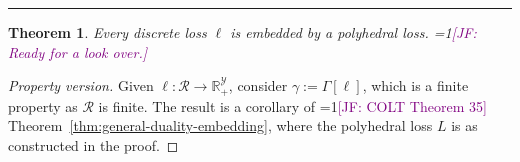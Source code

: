 \documentclass[12pt]{article}
\newcommand{\Comments}{1}
\newcommand{\mynote}[2]{\ifnum\Comments=1\textcolor{#1}{#2}\fi}
\newcommand{\raf}[1]{\mynote{green}{[RF: #1]}}
\newcommand{\jessie}[1]{\mynote{purple}{[JF: #1]}}
\newcommand{\reals}{\mathbb{R}}
\newcommand{\prop}[1]{\Gamma[#1]}
\newcommand{\simplex}{\Delta_\Y}
\newcommand{\R}{\mathcal{R}}
\newcommand{\Y}{\mathcal{Y}}
\newcommand{\risk}[1]{\underline{#1}}
\newtheorem{theorem}{Theorem}
\begin{document}
\hrule
\hrulefill

\begin{theorem}\label{thm:discrete-loss-poly-embeddable}
  Every discrete loss $\ell$ is embedded by a polyhedral loss.
  \jessie{Ready for a look over.}
\end{theorem}
\begin{proof}[Property version]
  Given $\ell:\R \to \reals_+^\Y$, consider $\gamma := \prop{\ell}$, which is a finite property as $\R$ is finite.
  The result is a corollary of \jessie{COLT Theorem 35} Theorem~\ref{thm:general-duality-embedding}, where the polyhedral loss $L$ is as constructed in the proof.
\end{proof}
\hrulefill
%
\end{document}
